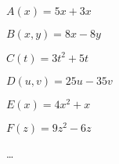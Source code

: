 \begin{exercice*}
$A(x)=5x+3x$\par
$B(x,y)=8x-8y$\par
$C(t)=3t^2+5t$\par
$D(u,v)=25u-35v$\par
$E(x)=4x^2+x$\par
$F(z)=9z^2-6z$

\end{exercice*}
\begin{corrige}
    \dots
\end{corrige}


